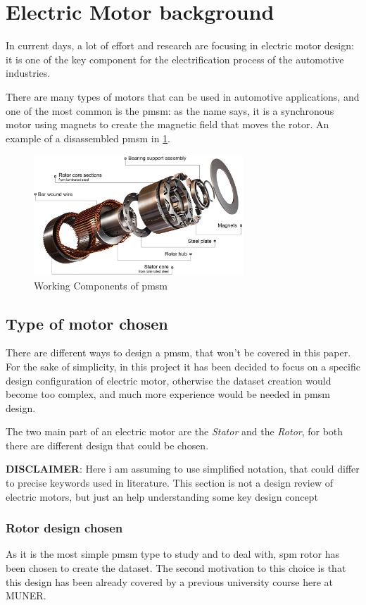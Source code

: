 \section{Electric Motor background}
In current days, a lot of effort and research are focusing in electric motor design: it is one of the key component for the electrification process of the automotive industries.

There are many types of motors that can be used in automotive applications, and one of the most common is the \gls{pmsm}: as the name says, it is a synchronous motor using magnets to create the magnetic field that moves the rotor. An example of a disassembled \gls{pmsm} in \cref{fig:PMSM_figure}.
\begin{figure}[H]
    \centering
    \includegraphics[width=0.7\textwidth]{sections/images/section1/ipmsm_disassembled_w1000.jpg}
    \caption{Working Components of \gls{pmsm}\cite{pmsm_review}}
    \label{fig:PMSM_figure}
\end{figure}
\subsection{Type of motor chosen}
There are different ways to design a \gls{pmsm}\cite{pmsm_review}, that won't be covered in this paper. For the sake of simplicity, in this project it has been decided to focus on a specific design configuration of electric motor, otherwise the dataset creation would become too complex, and much more experience would be needed in \gls{pmsm} design.

The two main part of an electric motor are the \emph{Stator} and the \emph{Rotor}, for both there are different design that could be chosen.

\textbf{DISCLAIMER}: Here i am assuming to use simplified notation, that could differ to precise keywords used in literature. This section is not a design review of electric motors, but just an help understanding some key design concept
\subsubsection{Rotor design chosen}
As it is the most simple \gls{pmsm} type to study and to deal with, \gls{spm} rotor has been chosen to create the dataset. The second motivation to this choice is that this design has been already covered by a previous university course here at MUNER\cite{MUNER}.

